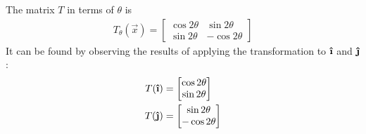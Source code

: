 \documentclass[letterpaper,12pt]{report}
\newcommand{\uvec}[1]{\boldsymbol{\hat{\textbf{#1}}}}
\begin{document}
\newpage
The matrix $T$ in terms of $\theta$ is
\begin{align*}
  T_{\theta}(\vec{x}) =
  \begin{bmatrix}
    \cos{2\theta} & \sin{2\theta} \\
    \sin{2\theta} & -\cos{2\theta}
  \end{bmatrix}
\end{align*}
It can be found by observing the results of applying the transformation to $\uvec{\i}$ and $\uvec{\j}$:
\begin{align*}
  T(\uvec{\i}) &= \begin{bmatrix}
    \cos{2\theta} \\ \sin{2\theta}
  \end{bmatrix} \\
  T(\uvec{\j}) &= \begin{bmatrix}
    \sin{2\theta} \\ -\cos{2\theta}
  \end{bmatrix}
\end{align*}




\end{document}
